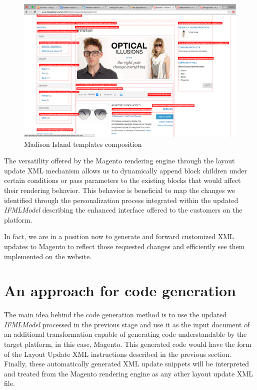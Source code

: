 \vspace{0.5cm}
\begin{figure}[H]
  \centering
    \includegraphics[width=14cm]{images/magento/madison-island-theme.png}
  \caption{Madison Island templates composition}
  \label{fig:magento-madison-island-theme}
\end{figure}
\vspace{0.5cm}

The versatility offered by the Magento rendering engine through the layout update XML mechanism allows us to dynamically append block children under certain conditions or pass parameters to the existing blocks that would affect their rendering behavior. This behavior is beneficial to map the changes we identified through the personalization process integrated within the updated \textit{IFMLModel} describing the enhanced interface offered to the customers on the platform.

In fact, we are in a position now to generate and forward customized XML updates to Magento to reflect those requested changes and efficiently see them implemented on the website.

\newpage
\section{An approach for code generation}

The main idea behind the code generation method is to use the updated \textit{IFMLModel} processed in the previous stage and use it as the input document of an additional transformation capable of generating code understandable by the target platform, in this case, Magento. This generated code would have the form of the Layout Update XML instructions described in the previous section. Finally, these automatically generated XML update snippets will be interpreted and treated from the Magento rendering engine as any other layout update XML file.

